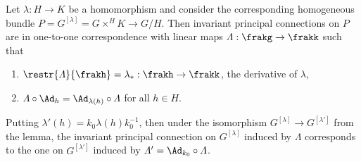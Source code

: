 \begin{thm}\label{thm 1.4.5 Cap}
    Let $\lambda:H\to K$ be a homomorphism and consider the corresponding homogeneous bundle $P=G^{[\lambda]}=G\times^H K\to G\slash H$. Then invariant principal connections on $P$ are in one-to-one correspondence with linear maps $\varLambda:\frakg\to \frakk$ such that 
    \begin{enumerate}[label=(\roman*)]
        \item $\restr{\varLambda}{\frakh}=\lambda_\ast:\frakh\to \frakk$, the derivative of $\lambda$,
        \item $\varLambda\circ \Ad_h=\Ad_{\lambda(h)}\circ\varLambda$ for all $h\in H$.
    \end{enumerate}
    Putting $\lambda'(h)=k_0\lambda(h)k_0^{-1}$, then under the isomorphism $G^{[\lambda]}\to G^{[\lambda']}$ from the lemma, the invariant principal connection on $G^{[\lambda]}$ induced by $\varLambda$ corresponds to the one on $G^{[\lambda']}$ induced by $\varLambda'=\Ad_{k_0}\circ\varLambda$.
\end{thm}
